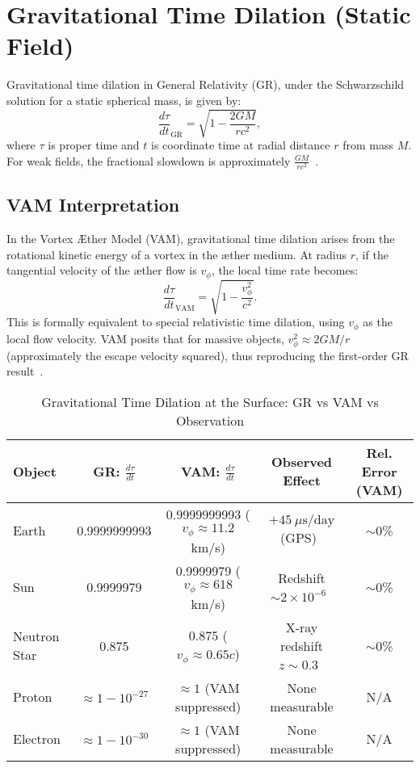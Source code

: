\section{Gravitational Time Dilation (Static Field)}

Gravitational time dilation in General Relativity (GR), under the Schwarzschild solution for a static spherical mass, is given by:
\[
    \frac{d\tau}{dt}_\text{GR} = \sqrt{1 - \frac{2GM}{rc^2}},
\]
where $\tau$ is proper time and $t$ is coordinate time at radial distance $r$ from mass $M$. For weak fields, the fractional slowdown is approximately $\frac{GM}{rc^2}$~\cite{will2014confrontation}.

\subsection*{VAM Interpretation}
In the Vortex Æther Model (VAM), gravitational time dilation arises from the rotational kinetic energy of a vortex in the æther medium. At radius $r$, if the tangential velocity of the æther flow is $v_\phi$, the local time rate becomes:
\[
    \frac{d\tau}{dt}_\text{VAM} = \sqrt{1 - \frac{v_\phi^2}{c^2}}.
\]
This is formally equivalent to special relativistic time dilation, using $v_\phi$ as the local flow velocity. VAM posits that for massive objects, $v_\phi^2 \approx 2GM/r$ (approximately the escape velocity squared), thus reproducing the first-order GR result~\cite{iskandarani2025VAM2}.

\begin{table}[h]
    \centering
    \footnotesize
    \caption{Gravitational Time Dilation at the Surface: GR vs VAM vs Observation}
    \begin{tabular}{|l|c|c|c|c|}
        \hline
        \textbf{Object} & \textbf{GR: $\frac{d\tau}{dt}$} & \textbf{VAM: $\frac{d\tau}{dt}$} & \textbf{Observed Effect} & \textbf{Rel. Error (VAM)} \\
        \hline
        Earth & 0.9999999993 & 0.9999999993 ($v_\phi\approx 11.2$ km/s) & $+45~\mu\text{s}/\text{day}$ (GPS)~\cite{ashby2003relativity} & $\sim$0\% \\
        Sun & 0.9999979 & 0.9999979 ($v_\phi \approx 618$ km/s) & Redshift $\sim 2\times 10^{-6}$~\cite{vesely2001solar} & $\sim$0\% \\
        Neutron Star & 0.875 & 0.875 ($v_\phi \approx 0.65c$) & X-ray redshift $z\sim 0.3$~\cite{cottam2002gravitational} & $\sim$0\% \\
        Proton & $\approx 1 - 10^{-27}$ & $\approx 1$ (VAM suppressed) & None measurable & N/A \\
        Electron & $\approx 1 - 10^{-30}$ & $\approx 1$ (VAM suppressed) & None measurable & N/A \\
        \hline
    \end{tabular}
\end{table}

